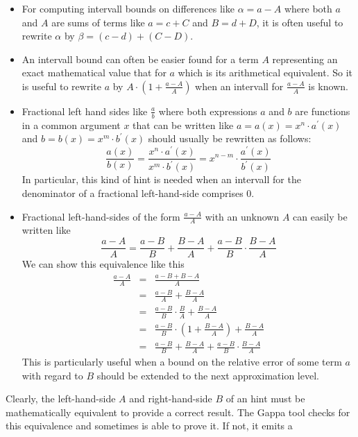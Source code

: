 \begin{itemize}
\item For computing intervall bounds on differences like $\alpha = a - A$ where both $a$ and $A$ are sums of terms like 
$a = c + C$ and $B = d + D$, it is often useful to rewrite $\alpha$ by $\beta = \left(c - d \right) + \left( C - D \right)$.
\item An intervall bound can often be easier found for a term $A$ representing an exact mathematical value that for $a$
which is its arithmetical equivalent. So it is useful to rewrite $a$ by $A \cdot \left( 1 + \frac{a - A}{A} \right)$ when 
an intervall for $\frac{a - A}{A}$ is known. 
\item Fractional left hand sides like $\frac{a}{b}$ where both expressions $a$ and $b$ are functions in a common argument
$x$ that can be written like $a = a\left( x \right) = x^n \cdot a^\prime\left( x \right)$ and 
$b = b\left( x \right) = x^m \cdot b^\prime\left( x \right)$ should usually be rewritten as follows:
$$\frac{a\left(x\right)}{b\left( x \right)} = \frac{x^n \cdot a^\prime\left( x \right)}{x^m \cdot b^\prime\left( x \right)} = 
x^{n - m} \cdot \frac{a^\prime\left( x \right)}{b^\prime\left( x \right)}$$ In particular, this kind of hint is needed when an 
intervall for the denominator of a fractional left-hand-side comprises $0$.
\item Fractional left-hand-sides of the form $\frac{a - A}{A}$ with an unknown $A$ can easily be written like
$$\frac{a - A}{A} = \frac{a - B}{B} + \frac{B - A}{A} + \frac{a - B}{B} \cdot \frac{B - A}{A}$$
We can show this equivalence like this
\begin{eqnarray*}
\frac{a - A}{A} & = & \frac{a - B + B - A}{A} \\
& = & \frac{a - B}{A} + \frac{B - A}{A} \\
& = & \frac{a - B}{B} \cdot \frac{B}{A} + \frac{B - A}{A} \\
& = & \frac{a - B}{B} \cdot \left( 1 + \frac{B - A}{A} \right) + \frac{B - A}{A} \\
& = & \frac{a - B}{B} + \frac{B - A}{A} + \frac{a - B}{B} \cdot \frac{B - A}{A}
\end{eqnarray*}
This is particularly useful when a bound on the relative error of some term $a$ with regard to $B$ should be 
extended to the next approximation level. 
\end{itemize}
Clearly, the left-hand-side $A$ and right-hand-side $B$ of an hint must be mathematically equivalent to provide a 
correct result. The Gappa tool checks for this equivalence and sometimes is able to prove it. If not, it emits a

